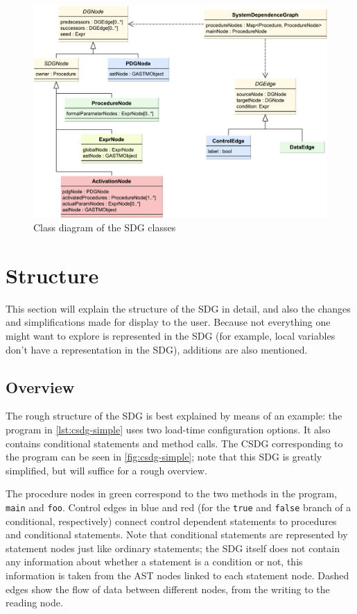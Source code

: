\begin{figure}[htb]
  \centering
    \includegraphics[width=\textwidth]{bilder/classes-sdg}
  \caption{Class diagram of the SDG classes}
  \label{fig:classes-sdg}
\end{figure}


\section{Structure}

This section will explain the structure of the SDG in detail, and also the changes and simplifications made for display 
to the user. Because not everything one might want to explore is represented in the SDG (for example, local variables 
don't have a representation in the SDG), additions are also mentioned.


\subsection{Overview}

The rough structure of the SDG is best explained by means of an example: the program in \autoref{lst:csdg-simple} uses 
two load-time configuration options. It also contains conditional statements and method calls. The CSDG corresponding 
to the program can be seen in \autoref{fig:csdg-simple}; note that this SDG is greatly simplified, but will suffice for 
a rough overview.

The procedure nodes in green correspond to the two methods in the program, \lstinline|main| and \lstinline|foo|. 
Control edges in blue and red (for the \lstinline|true| and \lstinline|false| branch of a conditional, respectively) 
connect control dependent statements to procedures and conditional statements. Note that conditional statements are 
represented by statement nodes just like ordinary statements; the SDG itself does not contain any information about 
whether a statement is a condition or not, this information is taken from the AST nodes linked to each statement node. 
Dashed edges show the flow of data between different nodes, from the writing to the reading node.


